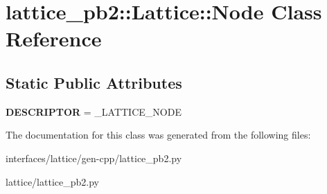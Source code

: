 \hypertarget{classlattice__pb2_1_1Lattice_1_1Node}{
\section{lattice\_\-pb2::Lattice::Node Class Reference}
\label{classlattice__pb2_1_1Lattice_1_1Node}
}
\subsection*{Static Public Attributes}
\begin{DoxyCompactItemize}
\item 
\hypertarget{classlattice__pb2_1_1Lattice_1_1Node_a0605b68e30ed2b5eaf56fd4b8b4d1019}{
{\bfseries DESCRIPTOR} = \_\-LATTICE\_\-NODE}
\label{classlattice__pb2_1_1Lattice_1_1Node_a0605b68e30ed2b5eaf56fd4b8b4d1019}

\end{DoxyCompactItemize}


The documentation for this class was generated from the following files:\begin{DoxyCompactItemize}
\item 
interfaces/lattice/gen-\/cpp/lattice\_\-pb2.py\item 
lattice/lattice\_\-pb2.py\end{DoxyCompactItemize}
